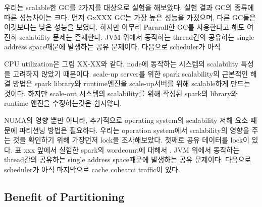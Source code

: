 \fi

\ifkor
우리는 scalable한 GC를 2가지를 대상으로 실험을 해보았다.
실험 결과 GC의 종류에 따른 성능차이는 크다.
먼저 GxXXX GC는 가장 높은 성능을 가졌으며, 다른 GC들은 이것보다는 낮은 성능을
보였다. 
하지만 아무리 Pararall한 GC를 사용한다고 해도 여전히 scalability 문제는 존재한다.
JVM 위에서 동작하는 thread간의 공유하는 single address space때문에 발생하는 공유 문제이다.
다음으로 scheduler가 아직 
\else

\fi





\ifkor
CPU utilization은 그림 XX-XX와 같다. 
node에 동작하는 시스템의 scalability 특성을 고려하지 않았기 때문이다. 
scale-up server를 위한 spark scalability의 근본적인 해결 방법은 spark library와 
runtime엔진을 scale-up서버를 위해 scalable하게 만드는 것이다.
하지만 scale-out 시스템의 scalability를 위해 작성된 spark의 library와 runtime 엔진을 
수정하는것은 쉽지않다.
\else

\fi


\ifkor
NUMA의 영향 뿐만 아니라, 추가적으로 operating system의 scalability 저해 요소 때문에 
파티션닝 방법은 필요하다.
우리는 operation system에서 scalability의 영향을 주는 것을 확인하기 위해 가장먼저
lock을 조사해보았다.
첫째로 공유 데이터를 lock이 있다. 표 xxx 앞에서 실험한 spark의 wordcount에 대해서 .
JVM 위에서 동작하는 thread간의 공유하는 single address space때문에 발생하는 공유 문제이다.
다음으로 scheduler가 아직 
마지막으로 cache cohearci traffic이 있다. 
\else

\fi



\subsection{Benefit of Partitioning}


